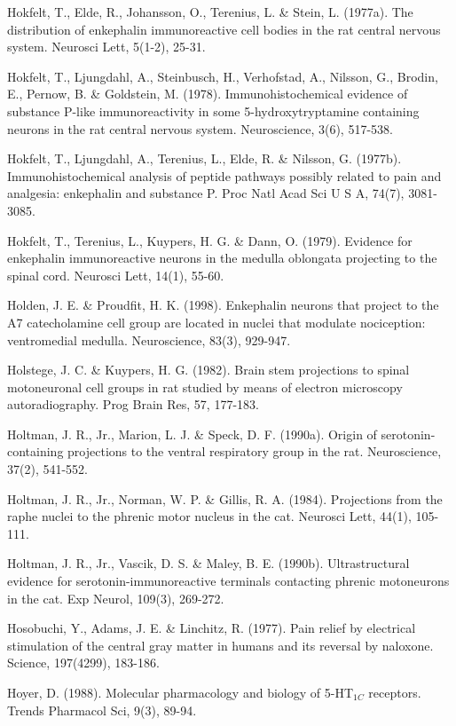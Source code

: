 \documentclass[a4paper,12pt,twoside]{report}
\begin{document}
\begin{singlespacing}
\begin{footnotesize}
Hokfelt, T., Elde, R., Johansson, O., Terenius, L. \& Stein, L. (1977a). The distribution of enkephalin immunoreactive cell bodies in the rat central nervous system. Neurosci Lett, 5(1-2), 25-31.

Hokfelt, T., Ljungdahl, A., Steinbusch, H., Verhofstad, A., Nilsson, G., Brodin, E., Pernow, B. \& Goldstein, M. (1978). Immunohistochemical evidence of substance P-like immunoreactivity in some 5-hydroxytryptamine containing neurons in the rat central nervous system. Neuroscience, 3(6), 517-538.

Hokfelt, T., Ljungdahl, A., Terenius, L., Elde, R. \& Nilsson, G. (1977b). Immunohistochemical analysis of peptide pathways possibly related to pain and analgesia: enkephalin and substance P. Proc Natl Acad Sci U S A, 74(7), 3081-3085.

Hokfelt, T., Terenius, L., Kuypers, H. G. \& Dann, O. (1979). Evidence for enkephalin immunoreactive neurons in the medulla oblongata projecting to the spinal cord. Neurosci Lett, 14(1), 55-60.

Holden, J. E. \& Proudfit, H. K. (1998). Enkephalin neurons that project to the A7 catecholamine cell group are located in nuclei that modulate nociception: ventromedial medulla. Neuroscience, 83(3), 929-947.

Holstege, J. C. \& Kuypers, H. G. (1982). Brain stem projections to spinal motoneuronal cell groups in rat studied by means of electron microscopy autoradiography. Prog Brain Res, 57, 177-183.

Holtman, J. R., Jr., Marion, L. J. \& Speck, D. F. (1990a). Origin of serotonin-containing projections to the ventral respiratory group in the rat. Neuroscience, 37(2), 541-552.

Holtman, J. R., Jr., Norman, W. P. \& Gillis, R. A. (1984). Projections from the raphe nuclei to the phrenic motor nucleus in the cat. Neurosci Lett, 44(1), 105-111.

Holtman, J. R., Jr., Vascik, D. S. \& Maley, B. E. (1990b). Ultrastructural evidence for serotonin-immunoreactive terminals contacting phrenic motoneurons in the cat. Exp Neurol, 109(3), 269-272.

Hosobuchi, Y., Adams, J. E. \& Linchitz, R. (1977). Pain relief by electrical stimulation of the central gray matter in humans and its reversal by naloxone. Science, 197(4299), 183-186.

Hoyer, D. (1988). Molecular pharmacology and biology of 5-HT$_{1C}$ receptors. Trends Pharmacol Sci, 9(3), 89-94.


\end{footnotesize}
\end{singlespacing}
\end{document}
